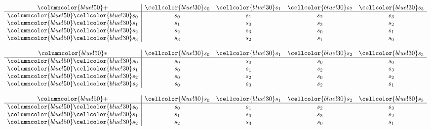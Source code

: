 \documentclass{article}
\begin{document}
\begin{center}
\begin{minipage}{0.23\textwidth}
    \centering
    \renewcommand{\arraystretch}{1.5} 
    \[
    \begin{array}{>{\columncolor{blue!50}}c|cccc}
    + & \cellcolor{blue!30}s_0 & \cellcolor{blue!30}s_1 & \cellcolor{blue!30}s_2 & \cellcolor{blue!30}s_3 \\ \hline
    \cellcolor{blue!30}s_0 & s_0 & s_1 & s_2 & s_3 \\
    \cellcolor{blue!30}s_1 & s_1 & s_0 & s_3 & s_2 \\
    \cellcolor{blue!30}s_2 & s_2 & s_3 & s_0 & s_1 \\
    \cellcolor{blue!30}s_3 & s_3 & s_2 & s_1 & s_0 \\
    \end{array}
    \]
\end{minipage}%
\hfill
\begin{minipage}{0.23\textwidth}
    \centering
    \renewcommand{\arraystretch}{1.5} 
    \[
    \begin{array}{>{\columncolor{blue!50}}c|cccc}
    * & \cellcolor{blue!30}s_0 & \cellcolor{blue!30}s_1 & \cellcolor{blue!30}s_2 & \cellcolor{blue!30}s_3 \\ \hline
    \cellcolor{blue!30}s_0 & s_0 & s_0 & s_0 & s_0 \\
    \cellcolor{blue!30}s_1 & s_0 & s_1 & s_2 & s_3 \\
    \cellcolor{blue!30}s_2 & s_0 & s_2 & s_0 & s_2 \\
    \cellcolor{blue!30}s_2 & s_0 & s_3 & s_2 & s_1 \\
    \end{array}
    \]
\end{minipage}
\hspace{0.75cm}
\begin{minipage}{0.23\textwidth}
    \centering
    \renewcommand{\arraystretch}{1.5} 
    \[
    \begin{array}{>{\columncolor{blue!50}}c|cccc}
    + & \cellcolor{blue!30}s_0 & \cellcolor{blue!30}s_1 & \cellcolor{blue!30}s_2 & \cellcolor{blue!30}s_3 \\ \hline
    \cellcolor{blue!30}s_0 & s_0 & s_1 & s_2 & s_3 \\
    \cellcolor{blue!30}s_1 & s_1 & s_0 & s_3 & s_2 \\
    \cellcolor{blue!30}s_2 & s_2 & s_3 & s_0 & s_1 \\

\end{array}\]
\end{minipage}
\end{center}
\end{document}
